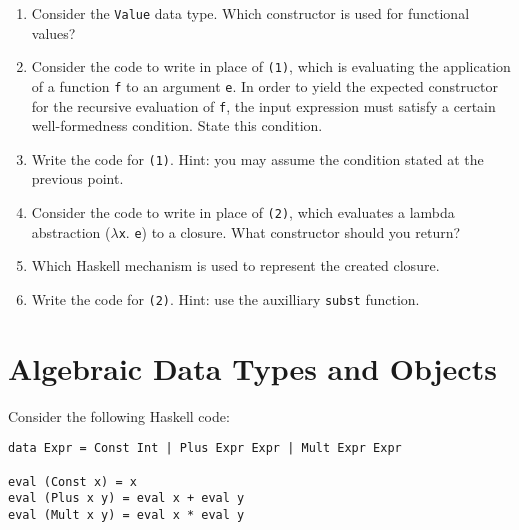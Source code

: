 \documentclass{article}
\newcommand{\answer}[1]{}
\begin{document}
\begin{enumerate}
\item Consider the \texttt{Value} data type. Which constructor is used
  for functional values? 

\item Consider the code to write in place of \texttt{(1)}, which is
  evaluating the application of a function \texttt{f} to an argument
  \texttt{e}. In order to yield the expected constructor for the recursive
  evaluation of \texttt{f}, the input expression must satisfy a certain well-formedness condition.
  State this condition. 

\item Write the code for \texttt{(1)}. Hint: you may assume the condition
  stated at the previous point. 

\item Consider the code to write in place of \texttt{(2)}, which
  evaluates a lambda abstraction ($\lambda$\texttt{x}. \texttt{e}) to a closure. What constructor
  should you return? 

\item Which Haskell mechanism is used to represent the created
  closure. 

\item Write the code for \texttt{(2)}. Hint: use the auxilliary
  \texttt{subst} function. 

\end{enumerate}

\answer{
\begin{enumerate}
\item Fun
\item Input program well-typed
\item \texttt{let Fun f' = eval f in f' (eval e)}
\item Fun
\item a Haskell function (or a Haskell closure). We depend on the
  underlying host language mechanism to evaluate functions.
\item \texttt{Fun (\v -> eval (subst x v e))}
\end{enumerate}
}

\newpage
\section{Algebraic Data Types and Objects}
Consider the following Haskell code:
\begin{verbatim}
data Expr = Const Int | Plus Expr Expr | Mult Expr Expr

eval (Const x) = x
eval (Plus x y) = eval x + eval y
eval (Mult x y) = eval x * eval y
\end{verbatim}
\end{document}
